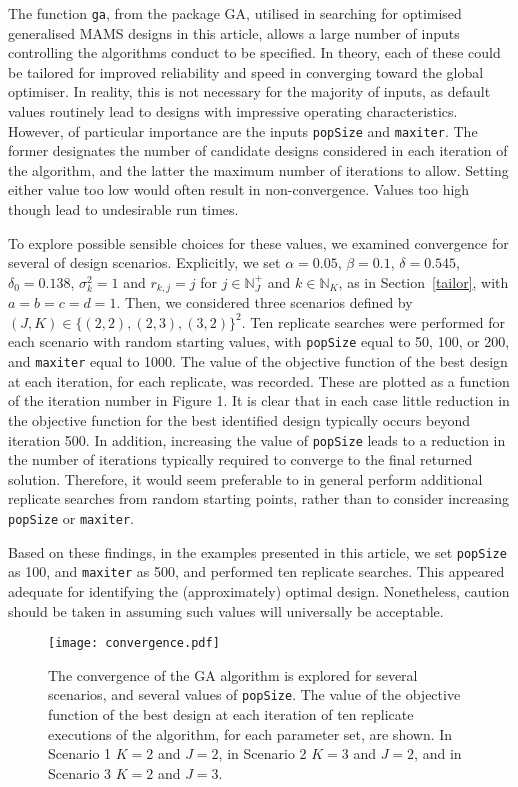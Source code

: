 \documentclass{article}
\numberwithin{equation}{section}
\theoremstyle{plain}
\begin{document}
The function \texttt{ga}, from the package GA, utilised in searching for optimised generalised MAMS designs in this article, allows a large number of inputs controlling the algorithms conduct to be specified. In theory, each of these could be tailored for improved reliability and speed in converging toward the global optimiser. In reality, this is not necessary for the majority of inputs, as default values routinely lead to designs with impressive operating characteristics. However, of particular importance are the inputs \texttt{popSize} and \texttt{maxiter}. The former designates the number of candidate designs considered in each iteration of the algorithm, and the latter the maximum number of iterations to allow. Setting either value too low would often result in non-convergence. Values too high though lead to undesirable run times.

To explore possible sensible choices for these values, we examined convergence for several of design scenarios. Explicitly, we set $\alpha=0.05$, $\beta=0.1$, $\delta=0.545$, $\delta_0=0.138$, $\sigma_k^2=1$ and $r_{k,j}=j$ for $j\in\mathbb{N}_J^+$ and $k\in\mathbb{N}_K$, as in Section~\ref{tailor}, with $a=b=c=d=1$. Then, we considered three scenarios defined by $(J,K)\in\{(2,2),(2,3),(3,2)\}^2$. Ten replicate searches were performed for each scenario with random starting values, with \texttt{popSize} equal to 50, 100, or 200, and \texttt{maxiter} equal to 1000. The value of the objective function of the best design at each iteration, for each replicate, was recorded. These are plotted as a function of the iteration number in Figure 1. It is clear that in each case little reduction in the objective function for the best identified design typically occurs beyond iteration 500. In addition, increasing the value of \texttt{popSize} leads to a reduction in the number of iterations typically required to converge to the final returned solution. Therefore, it would seem preferable to in general perform additional replicate searches from random starting points, rather than to consider increasing \texttt{popSize} or \texttt{maxiter}.

Based on these findings, in the examples presented in this article, we set \texttt{popSize} as 100, and \texttt{maxiter} as 500, and performed ten replicate searches. This appeared adequate for identifying the (approximately) optimal design. Nonetheless, caution should be taken in assuming such values will universally be acceptable.

\begin{figure}[htb]
	\begin{center}\label{fig1}
		\texttt{[image: convergence.pdf]}
		\caption{The convergence of the GA algorithm is explored for several scenarios, and several values of \texttt{popSize}. The value of the objective function of the best design at each iteration of ten replicate executions of the algorithm, for each parameter set, are shown. In Scenario 1 $K=2$ and $J=2$, in Scenario 2 $K=3$ and $J=2$, and in Scenario 3 $K=2$ and $J=3$.}
	\end{center}
\end{figure}
\end{document}
